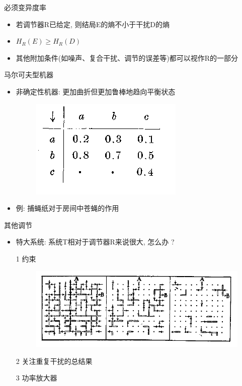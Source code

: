 \documentclass[12pt,AutoFakeBold,aspectratio=43,mathserif]{beamer}
\begin{document}
    \begin{frame}{必须变异度率}
        \begin{itemize}
                \item 若调节器R已给定, 则结局E的熵不小于干扰D的熵
                \item $H_R(E)\geq H_R(D)$
                \item 其他附加条件(如噪声、复合干扰、调节的误差等)都可以视作R的一部分
        \end{itemize}
    \end{frame}
    \begin{frame}{马尔可夫型机器}
        \begin{itemize}
                \item 非确定性机器: 更加曲折但更加鲁棒地趋向平衡状态
                \begin{figure}[H]
                \centering
                \includegraphics[width=.6\textwidth]{figures/pic3.png}
                \end{figure}
                \item 例: 捕蝇纸对于房间中苍蝇的作用
        \end{itemize}
        
    \end{frame}
      
    \begin{frame}{其他调节}
        \begin{itemize}
                \item 特大系统: 系统T相对于调节器R来说很大, 怎么办 ?
                \item[1] 约束
                \begin{figure}[H]
                \centering
                \includegraphics[width=.6\textwidth]{figures/pic4.png}
                \end{figure}
                \item[2] 关注重复干扰的总结果
                \item[3] 功率放大器
        \end{itemize}
    \end{frame}
\end{document}
